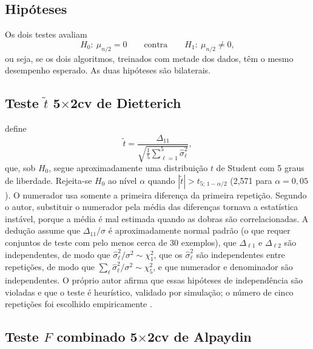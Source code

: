 \documentclass[11pt,a4paper]{article}
\begin{document}
\subsection{Hipóteses}

Os dois testes avaliam
\begin{equation}
  H_0:\ \mu_{n/2}=0
  \qquad\text{contra}\qquad
  H_1:\ \mu_{n/2}\neq0,
  \label{eq:hipoteses5x2}
\end{equation}
ou seja, se os dois algoritmos, treinados com metade dos dados, têm o mesmo
desempenho esperado. As duas hipóteses são bilaterais.

\subsection{\texorpdfstring{Teste $\tilde t$ 5$\times$2cv de Dietterich}{Teste t 5x2cv de Dietterich}}

\citet{dietterich1998approximate} define
\begin{equation}
  \tilde t=\frac{\Delta_{11}}{\sqrt{\tfrac15\sum_{\ell=1}^{5}\hat\sigma_\ell^{2}}},
  \label{eq:dietterich}
\end{equation}
que, sob $H_0$, segue aproximadamente uma distribuição $t$ de Student com 5
graus de liberdade. Rejeita-se $H_0$ ao nível $\alpha$ quando
$|\tilde t|>t_{5;\,1-\alpha/2}$ (2,571 para $\alpha=0{,}05$). O numerador usa
somente a primeira diferença da primeira repetição. Segundo o autor,
substituir o numerador pela média das diferenças tornava a estatística
instável, porque a média é mal estimada quando as dobras são correlacionadas.
A dedução assume que $\Delta_{11}/\sigma$ é aproximadamente normal padrão (o que
requer conjuntos de teste com pelo menos cerca de 30 exemplos), que
$\Delta_{\ell 1}$ e $\Delta_{\ell 2}$ são independentes, de modo que $\hat\sigma_\ell^2/\sigma^2\sim\chi^2_1$,
que os $\hat\sigma_\ell^2$ são independentes entre repetições, de modo que
$\sum_\ell \hat\sigma_\ell^2/\sigma^2\sim\chi^2_5$, e que numerador e denominador são
independentes. O próprio autor afirma que essas hipóteses de independência são
violadas e que o teste é heurístico, validado por simulação; o número de cinco
repetições foi escolhido empiricamente \citep{dietterich1998approximate}.

\subsection{\texorpdfstring{Teste $F$ combinado 5$\times$2cv de Alpaydin}{Teste F combinado 5x2cv de Alpaydin}}
\end{document}
